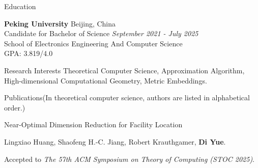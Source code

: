 \documentclass{resume} %
\begin{document}

\begin{rSection}{Education}

{\bf Peking University} \hfill {Beijing, China} 
\\ Candidate for Bachelor of Science \hfill {\em September 2021 - July 2025}
\\ School of Electronics Engineering And Computer Science
\\ GPA: 3.819/4.0



\end{rSection}

\begin{rSection}{Research Interests}{}
Theoretical Computer Science, Approximation Algorithm, High-dimensional Computational Geometry, Metric Embeddings.
\end{rSection}

\begin{rSection}{Publications}{(In theoretical computer science, authors are listed in alphabetical order.)}

    \begin{pubSubsection}{Near-Optimal Dimension Reduction for Facility Location}
        \item Lingxiao Huang, Shaofeng H.-C. Jiang, Robert Krauthgamer, \textbf{Di Yue}.
        \item Accepted to \emph{The 57th ACM Symposium on Theory of Computing (STOC 2025)}.
    \end{pubSubsection}
\end{rSection}
\end{document}

